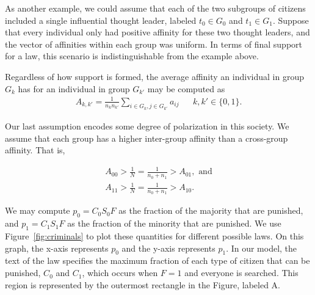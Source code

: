 As another example, we could assume that each of the two subgroups of citizens included a single influential thought leader, labeled $t_0 \in G_0$ and $t_1 \in G_1$.  Suppose that every individual only had positive affinity for these two thought leaders, and the vector of affinities within each group was uniform.  In terms of final support for a law, this scenario is indistinguishable from the example above.


Regardless of how support is formed, the average affinity an individual in group $G_k$ has for an individual in group $G_{k'}$ may be computed as 
\begin{align}
A_{k,k'} = \frac{1}{n_k n_{k'}}\sum_{i \in G_k,j\in G_{k'}} a_{ij} && \text{$k,k'\in\{0,1\}$}.
\end{align} %


Our last assumption encodes some degree of polarization in this society.  We assume that each group has a higher inter-group affinity than a cross-group affinity.  That is, 

\begin{align} 
A_{00} > \frac{1}{N}=\frac{1}{n_0+n_1} > A_{01},\text{ and} \\
A_{11} > \frac{1}{N}=\frac{1}{n_0+n_1}>  A_{10}.
\end{align}


We may compute %
$p_0 = C_0S_0F$ as the fraction of the majority that are punished, and $p_1 = C_1S_1F$ as the fraction of the minority that are punished.  We use Figure~\ref{fig:criminals} to plot these quantities for different possible laws.  On this graph, the x-axis represents $p_0$ and the y-axis represents $p_1$.  In our model, the text of the law specifies the maximum fraction of each type of citizen that can be punished, $C_0$ and $C_1$, which occurs when $F=1$ and everyone is searched.  This region is represented by the outermost rectangle in the Figure, labeled A.



